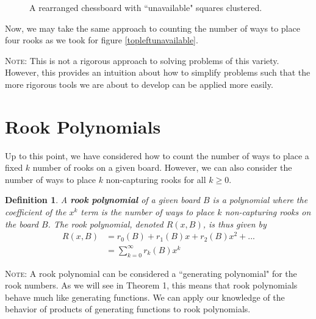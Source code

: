 \documentclass{article}
\newcommand{\w}{0.5}
\newcommand{\ww}{0.25}
\newcommand{\drawgraygrid}[2]{\fill[fill=gray!40!white] (0,0) rectangle (#1*\w,#2*\w); \draw[step=\w cm,black,thin] (0,0) grid (#1*\w,#2*\w);}
\newcommand{\labelcol}[2]{\draw (#1*\w cm - \ww cm, 0 cm) node[anchor=north] {#2};}
\newcommand{\labelrow}[2]{\draw (0 cm, #1*\w cm - \ww cm) node[anchor=east] {#2};}
\newcommand{\unshadesquare}[2]{\filldraw[fill=white, draw=black] (#1*\w - \w,#2*\w - \w) rectangle (#1*\w,#2*\w);}
\newtheorem{definition}{Definition}
\begin{document}
\begin{figure}[!h]
    \centering
    \caption{A rearranged chessboard with ``unavailable" squares clustered.}
    \label{rearranged}
\end{figure}

Now, we may take the same approach to counting the number of ways to place four rooks as we took for figure \ref{topleftunavailable}.

\textsc{Note:} This is not a rigorous approach to solving problems of this variety. However, this provides an intuition about how to simplify problems such that the more rigorous tools we are about to develop can be applied more easily.

\section{Rook Polynomials}

Up to this point, we have considered how to count the number of ways to place a fixed $k$ number of rooks on a given board. However, we can also consider the number of ways to place $k$ non-capturing rooks for all $k \geq 0$. 

\begin{definition}
    A \textbf{rook polynomial} of a given board $B$ is a polynomial where the coefficient of the $x^k$ term is the number of ways to place $k$ non-capturing rooks on the board $B$. The rook polynomial, denoted $R(x, B)$, is thus given by
    \begin{equation}\begin{split} \label{rookpoly}
       R(x,B) &= r_0(B) + r_1(B)x + r_2(B)x^2 + ... \\
        &= \sum_{k=0}^{\infty} r_k(B) x^k
    \end{split}\end{equation}
\end{definition}
\textsc{Note:} A rook polynomial can be considered a ``generating polynomial" for the rook numbers. As we will see in Theorem 1, this means that rook polynomials behave much like generating functions. We can apply our knowledge of the behavior of products of generating functions to rook polynomials.
\end{document}
